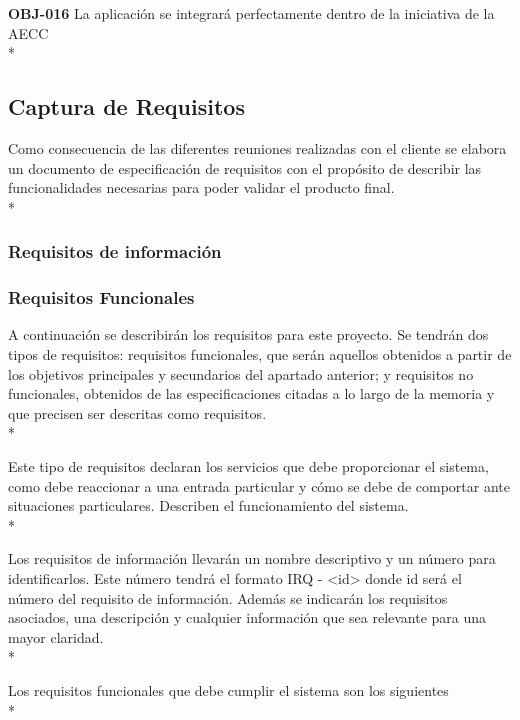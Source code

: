 \documentclass[../pfc.tex]{subfiles}
\begin{document}
	\textbf{OBJ-016}	La aplicación se integrará perfectamente dentro de la iniciativa de la AECC\\*
	
	

	
	
	\subsection{Captura de Requisitos}
	
	Como consecuencia de las diferentes reuniones realizadas con el cliente se elabora un
	documento de especificación de requisitos con el propósito de describir las funcionalidades
	necesarias para poder validar el producto final.\\*
	
	\subsubsection{Requisitos de información}
			
	
	\subsubsection{Requisitos Funcionales}
	
	A continuación se describirán los requisitos para este proyecto. Se tendrán dos tipos de
	requisitos: requisitos funcionales, que serán aquellos obtenidos a partir de los objetivos principales
	y secundarios del apartado anterior; y requisitos no funcionales, obtenidos de las especificaciones
	citadas a lo largo de la memoria y que precisen ser descritas como requisitos.\\*
	
	Este tipo de requisitos declaran los servicios que debe proporcionar el sistema, como debe
	reaccionar a una entrada particular y cómo se debe de comportar ante situaciones particulares.
	Describen el funcionamiento del sistema.\\*
	
	Los requisitos de información llevarán un nombre descriptivo y un número para identificarlos.
	Este número tendrá el formato IRQ - <id> donde id será el número del requisito de información.
	Además se indicarán los requisitos asociados, una descripción y cualquier información que sea
	relevante para una mayor claridad.\\*
	
	Los requisitos funcionales que debe cumplir el sistema son los siguientes\\*
	
\end{document}
